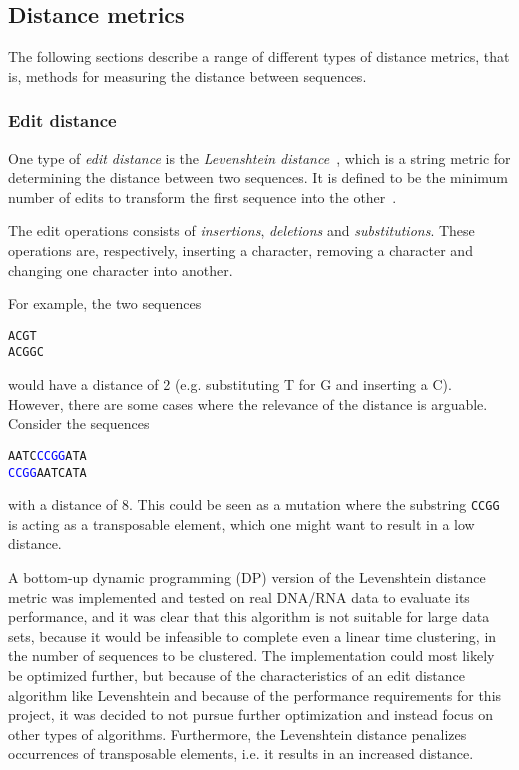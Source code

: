 \subsection{Distance metrics}

The following sections describe a range of different types of distance metrics,
that is, methods for measuring the distance between sequences.

\subsubsection{Edit distance}\label{sec:edit_distance}

One type of \emph{edit distance} is the \emph{Levenshtein
distance}~\cite{levenshtein}, which is a string metric for determining the
distance between two sequences. It is defined to be the minimum number of
edits to transform the first sequence into the other~\cite[p.~52]{dong}.

The edit operations consists of \emph{insertions}, \emph{deletions} and
\emph{substitutions}. These operations are, respectively, inserting a character,
removing a character and changing one character into another.

For example, the two sequences
\begin{center}
  \texttt{ACGT} \\
  \texttt{ACGGC}
\end{center}
would have a distance of \num{2} (e.g. substituting T for G and inserting a C).
However, there are some cases where the relevance of the distance is arguable.
Consider the sequences
\begin{center}
  \texttt{AATC\textcolor{blue}{CCGG}ATA} \\
  \texttt{\textcolor{blue}{CCGG}AATCATA}
\end{center}
with a distance of \num{8}. This could be seen as a mutation where the substring
\texttt{CCGG} is acting as a transposable element, which one might want to
result in a low distance.

A bottom-up dynamic programming (DP) version of the Levenshtein distance
metric was implemented and tested on real DNA/RNA data to evaluate its
performance, and it was clear that this algorithm is not suitable for large
data sets, because it would be infeasible to complete even a linear time
clustering, in the number of sequences to be clustered. The implementation
could most likely be optimized further, but because of the characteristics of
an edit distance algorithm like Levenshtein and because of the performance
requirements for this project, it was decided to not pursue further
optimization and instead focus on other types of algorithms. Furthermore, the
Levenshtein distance penalizes occurrences of transposable elements, i.e. it
results in an increased distance.

